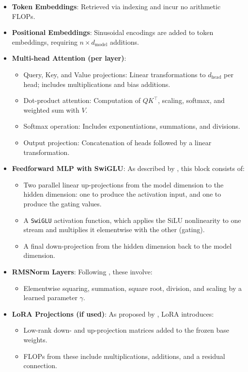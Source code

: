 \documentclass[a4paper,12pt]{article}
\begin{document}
\begin{itemize}
  \item \textbf{Token Embeddings}: Retrieved via indexing and incur no arithmetic FLOPs.
  
  \item \textbf{Positional Embeddings}: Sinusoidal encodings are added to token embeddings, requiring $n \times d_{\text{model}}$ additions.

  \item \textbf{Multi-head Attention (per layer)}:
  \begin{itemize}
    \item Query, Key, and Value projections: Linear transformations to $d_{\text{head}}$ per head; includes multiplications and bias additions.
    \item Dot-product attention: Computation of $QK^\top$, scaling, softmax, and weighted sum with $V$.
    \item Softmax operation: Includes exponentiations, summations, and divisions.
    \item Output projection: Concatenation of heads followed by a linear transformation.
  \end{itemize}

  \item \textbf{Feedforward MLP with SwiGLU}: As described by \citet{shazeer2020glu}, this block consists of:
  \begin{itemize}
    \item Two parallel linear up-projections from the model dimension to the hidden dimension: one to produce the activation input, and one to produce the gating values.
    \item A \texttt{SwiGLU} activation function, which applies the SiLU nonlinearity to one stream and multiplies it elementwise with the other (gating).
    \item A final down-projection from the hidden dimension back to the model dimension.
  \end{itemize}  

  \item \textbf{RMSNorm Layers}: Following \citet{zhang2019root}, these involve:
  \begin{itemize}
    \item Elementwise squaring, summation, square root, division, and scaling by a learned parameter $\gamma$.
  \end{itemize}

  \item \textbf{LoRA Projections (if used)}: As proposed by \citet{hu2021lora}, LoRA introduces:
  \begin{itemize}
    \item Low-rank down- and up-projection matrices added to the frozen base weights.
    \item FLOPs from these include multiplications, additions, and a residual connection.
  \end{itemize}


\end{itemize}
\end{document}
